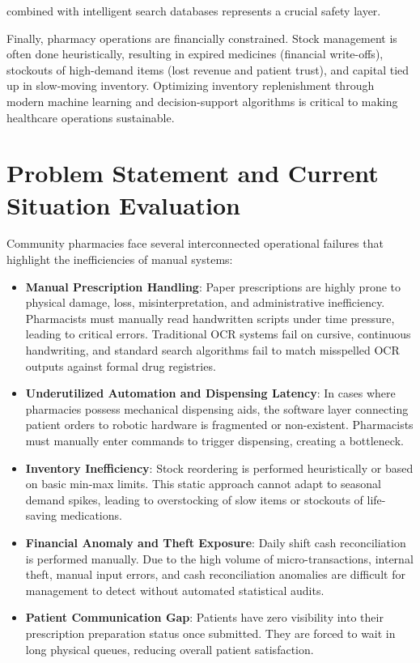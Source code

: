 \documentclass[12pt,a4paper,oneside]{report}
\begin{document}
combined with intelligent search databases represents a crucial safety
layer.

Finally, pharmacy operations are financially constrained. Stock
management is often done heuristically, resulting in expired medicines
(financial write-offs), stockouts of high-demand items (lost revenue and
patient trust), and capital tied up in slow-moving inventory. Optimizing
inventory replenishment through modern machine learning and
decision-support algorithms is critical to making healthcare operations
sustainable.

\section{Problem Statement and Current Situation
Evaluation}\label{problem-statement-and-current-situation-evaluation}

Community pharmacies face several interconnected operational failures
that highlight the inefficiencies of manual systems:

\begin{itemize}
\item
  \textbf{Manual Prescription Handling}: Paper prescriptions are highly
  prone to physical damage, loss, misinterpretation, and administrative
  inefficiency. Pharmacists must manually read handwritten scripts under
  time pressure, leading to critical errors. Traditional OCR systems
  fail on cursive, continuous handwriting, and standard search
  algorithms fail to match misspelled OCR outputs against formal drug
  registries.
\item
  \textbf{Underutilized Automation and Dispensing Latency}: In cases
  where pharmacies possess mechanical dispensing aids, the software
  layer connecting patient orders to robotic hardware is fragmented or
  non-existent. Pharmacists must manually enter commands to trigger
  dispensing, creating a bottleneck.
\item
  \textbf{Inventory Inefficiency}: Stock reordering is performed
  heuristically or based on basic min-max limits. This static approach
  cannot adapt to seasonal demand spikes, leading to overstocking of
  slow items or stockouts of life-saving medications.
\item
  \textbf{Financial Anomaly and Theft Exposure}: Daily shift cash
  reconciliation is performed manually. Due to the high volume of
  micro-transactions, internal theft, manual input errors, and cash
  reconciliation anomalies are difficult for management to detect
  without automated statistical audits.
\item
  \textbf{Patient Communication Gap}: Patients have zero visibility into
  their prescription preparation status once submitted. They are forced
  to wait in long physical queues, reducing overall patient
  satisfaction.
\end{itemize}
\end{document}
